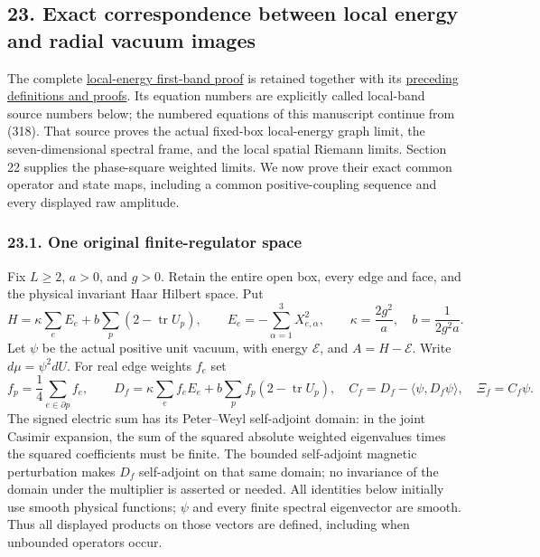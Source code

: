 \documentclass[
  11pt,
]{article}
\begin{document}
\subsection{23. Exact correspondence between local energy and radial
vacuum
images}\label{exact-correspondence-between-local-energy-and-radial-vacuum-images}

The complete
\href{sources/local_band_inputs/LOCAL_ENERGY_BAND_TRANSFER.md}{local-energy
first-band proof} is retained together with its
\href{sources/local_band_inputs/extensive_quantum_blocking.md}{preceding
definitions and proofs}. Its equation numbers are explicitly called
local-band source numbers below; the numbered equations of this
manuscript continue from (318). That source proves the actual fixed-box
local-energy graph limit, the seven-dimensional spectral frame, and the
local spatial Riemann limits. Section 22 supplies the phase-square
weighted limits. We now prove their exact common operator and state
maps, including a common positive-coupling sequence and every displayed
raw amplitude.

\subsubsection{23.1. One original finite-regulator
space}\label{one-original-finite-regulator-space}

Fix \(L\ge2\), \(a>0\), and \(g>0\). Retain the entire open box, every
edge and face, and the physical invariant Haar Hilbert space. Put \[
 H=\kappa\sum_e E_e+b\sum_p(2-\operatorname{tr}U_p),\qquad
 E_e=-\sum_{\alpha=1}^3X_{e,\alpha}^2,\qquad
 \kappa=\frac{2g^2}{a},\quad b=\frac1{2g^2a}.
\] Let \(\psi\) be the actual positive unit vacuum, with energy
\(\mathcal E\), and \(A=H-\mathcal E\). Write \(d\mu=\psi^2dU\). For
real edge weights \(f_e\) set \[
 f_p=\frac14\sum_{e\in\partial p}f_e,\qquad
 D_f=\kappa\sum_e f_eE_e+b\sum_p f_p(2-\operatorname{tr}U_p),
 \quad C_f=D_f-\langle\psi,D_f\psi\rangle,\quad \Xi_f=C_f\psi.
 \tag{319}
\] The signed electric sum has its Peter--Weyl self-adjoint domain: in
the joint Casimir expansion, the sum of the squared absolute weighted
eigenvalues times the squared coefficients must be finite. The bounded
self-adjoint magnetic perturbation makes \(D_f\) self-adjoint on that
same domain; no invariance of the domain under the multiplier is
asserted or needed. All identities below initially use smooth physical
functions; \(\psi\) and every finite spectral eigenvector are smooth.
Thus all displayed products on those vectors are defined, including when
unbounded operators occur.
\end{document}
